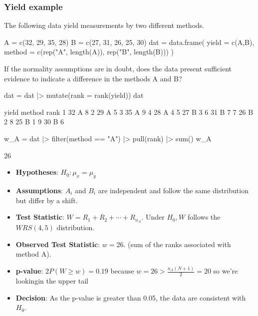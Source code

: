 \documentclass[a4paper]{article}
\begin{document}
\subsubsection{Yield example}
The following data yield measurements by two different methods.
\begin{Schunk}
\begin{Sinput}
A = c(32, 29, 35, 28)
B = c(27, 31, 26, 25, 30)
dat = data.frame(
  yield = c(A,B),
  method = c(rep("A", length(A)),
		   	 rep("B", length(B)))
)
\end{Sinput}
\end{Schunk}
If the normality assumptions are in doubt, does the data present sufficient evidence to indicate a difference in the methods A and B?
\begin{Schunk}
\begin{Sinput}
dat = dat |> mutate(rank = rank(yield))
dat
\end{Sinput}
\begin{Soutput}
  yield method rank
1    32      A    8
2    29      A    5
3    35      A    9
4    28      A    4
5    27      B    3
6    31      B    7
7    26      B    2
8    25      B    1
9    30      B    6
\end{Soutput}
\begin{Sinput}
w_A = dat |> 
filter(method == "A") |> 
pull(rank) |> 
sum()
w_A
\end{Sinput}
\begin{Soutput}
[1] 26
\end{Soutput}
\end{Schunk}
\begin{itemize}
	\item \textbf{Hypotheses}: \( H_0: \mu_x = \mu_y \)
	\item \textbf{Assumptions}: \( A_i \) and \( B_i \) are independent and follow the same distribution but differ by a shift.
	\item \textbf{Test Statistic}: \( W = R_1 + R_2 + \dotsb + R_{n_A} \). Under \( H_0, W \) follows the \( WRS (4,5) \) distribution.
	\item \textbf{Observed Test Statistic}: \( w =26 \). (sum of the ranks associated with method A).
	\item \textbf{p-value}: \( 2P(W \geq w) = 0.19 \) because \( w = 26 > \frac{n_A (N+1)}{2} = 20 \) so we're lookingin the upper tail
	\item \textbf{Decision}: As the p-value is greater than 0.05, the data are consistent with \( H_0 \).
\end{itemize}
\end{document}
